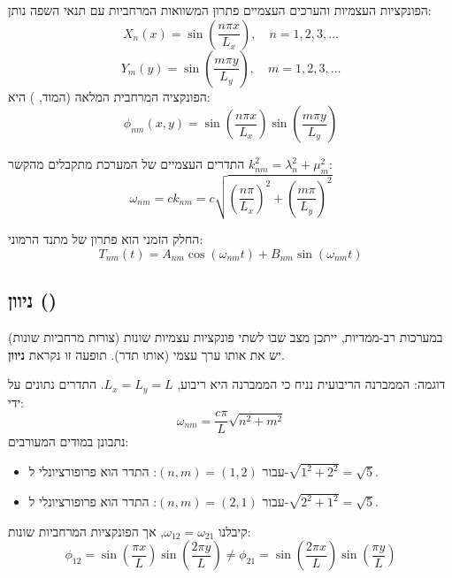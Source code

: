 \begin{resultbox}{הפונקציות העצמיות והערכים העצמיים}
פתרון המשוואות המרחביות עם תנאי השפה נותן:
\begin{equation}
X_n(x) = \sin\left( \frac{n\pi x}{L_x} \right), \quad n=1,2,3,\dots
\end{equation}
\begin{equation}
Y_m(y) = \sin\left( \frac{m\pi y}{L_y} \right), \quad m=1,2,3,\dots
\end{equation}
הפונקציה המרחבית המלאה (המוד, ) היא:
\begin{equation}
\phi_{nm}(x,y) = \sin\left( \frac{n\pi x}{L_x} \right) \sin\left( \frac{m\pi y}{L_y} \right)
\end{equation}
\end{resultbox}

התדרים העצמיים של המערכת מתקבלים מהקשר $k_{nm}^2 = \lambda_n^2 + \mu_m^2$:
\begin{equation}
\omega_{nm} = c k_{nm} = c \sqrt{\left(\frac{n\pi}{L_x}\right)^2 + \left(\frac{m\pi}{L_y}\right)^2}
\end{equation}

החלק הזמני הוא פתרון של מתנד הרמוני:
\begin{equation}
T_{nm}(t) = A_{nm} \cos(\omega_{nm} t) + B_{nm} \sin(\omega_{nm} t)
\end{equation}

\subsection{ניוון ()}

במערכות רב-ממדיות, ייתכן מצב שבו לשתי פונקציות עצמיות שונות (צורות מרחביות שונות) יש את אותו ערך עצמי (אותו תדר). תופעה זו נקראת \textbf{ניוון}.

\begin{examplebox}{דוגמה: הממברנה הריבועית}
נניח כי הממברנה היא ריבוע, $L_x = L_y = L$. התדרים נתונים על ידי:
\begin{equation}
\omega_{nm} = \frac{c\pi}{L} \sqrt{n^2 + m^2}
\end{equation}
נתבונן במודים המעורבים:
\begin{itemize}
    \item עבור $(n,m) = (1,2)$: התדר הוא פרופורציונלי ל-$\sqrt{1^2+2^2} = \sqrt{5}$.
    \item עבור $(n,m) = (2,1)$: התדר הוא פרופורציונלי ל-$\sqrt{2^2+1^2} = \sqrt{5}$.
\end{itemize}
קיבלנו $\omega_{12} = \omega_{21}$, אך הפונקציות המרחביות שונות:
\[ \phi_{12} = \sin\left(\frac{\pi x}{L}\right)\sin\left(\frac{2\pi y}{L}\right) \neq \phi_{21} = \sin\left(\frac{2\pi x}{L}\right)\sin\left(\frac{\pi y}{L}\right) \]
\end{examplebox}

